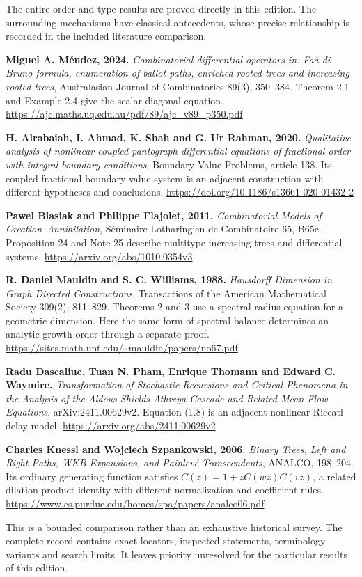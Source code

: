 The entire-order and type results are proved directly in this edition.
The surrounding mechanisms have classical antecedents, whose precise
relationship is recorded in the included literature comparison.

\textbf{Miguel A. M\'endez, 2024.} \textit{Combinatorial differential operators
in: Fa\`a di Bruno formula, enumeration of ballot paths, enriched rooted trees
and increasing rooted trees}, Australasian Journal of Combinatorics 89(3),
350--384. Theorem 2.1 and Example 2.4 give the scalar diagonal equation.
\url{https://ajc.maths.uq.edu.au/pdf/89/ajc_v89_p350.pdf}

\textbf{H. Alrabaiah, I. Ahmad, K. Shah and G. Ur Rahman, 2020.}
\textit{Qualitative analysis of nonlinear coupled pantograph differential
equations of fractional order with integral boundary conditions}, Boundary
Value Problems, article 138. Its coupled fractional boundary-value system is
an adjacent construction with different hypotheses and conclusions.
\url{https://doi.org/10.1186/s13661-020-01432-2}

\textbf{Pawel Blasiak and Philippe Flajolet, 2011.}
\textit{Combinatorial Models of Creation--Annihilation}, S\'eminaire
Lotharingien de Combinatoire 65, B65c. Proposition 24 and Note 25 describe
multitype increasing trees and differential systems.
\url{https://arxiv.org/abs/1010.0354v3}

\textbf{R. Daniel Mauldin and S. C. Williams, 1988.}
\textit{Hausdorff Dimension in Graph Directed Constructions}, Transactions
of the American Mathematical Society 309(2), 811--829. Theorems 2 and 3 use
a spectral-radius equation for a geometric dimension. Here the same form
of spectral balance determines an analytic growth order through a separate
proof.
\url{https://sites.math.unt.edu/~mauldin/papers/no67.pdf}

\textbf{Radu Dascaliuc, Tuan N. Pham, Enrique Thomann and Edward C. Waymire.}
\textit{Transformation of Stochastic Recursions and Critical Phenomena in the
Analysis of the Aldous-Shields-Athreya Cascade and Related Mean Flow Equations},
arXiv:2411.00629v2. Equation (1.8) is an adjacent nonlinear Riccati delay model.
\url{https://arxiv.org/abs/2411.00629v2}

\textbf{Charles Knessl and Wojciech Szpankowski, 2006.}
\textit{Binary Trees, Left and Right Paths, WKB Expansions, and Painlev\'e
Transcendents}, ANALCO, 198--204. Its ordinary generating function satisfies
$C(z)=1+zC(wz)C(vz)$, a related dilation-product identity with different
normalization and coefficient rules.
\url{https://www.cs.purdue.edu/homes/spa/papers/analco06.pdf}

This is a bounded comparison rather than an exhaustive historical survey. The complete record
contains exact locators, inspected statements, terminology variants and search
limits. It leaves priority unresolved for the particular results of this edition.

